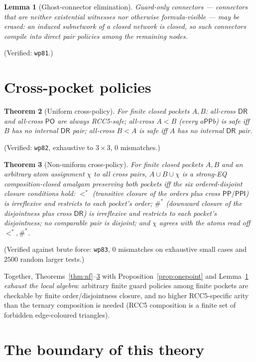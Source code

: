 \documentclass[11pt]{article}
\newcommand{\DR}{\mathsf{DR}}
\newcommand{\PO}{\mathsf{PO}}
\newcommand{\PP}{\mathsf{PP}}
\newcommand{\PPI}{\mathsf{PPI}}
\newcommand{\code}[1]{\texttt{#1}}
\theoremstyle{plain}
\newtheorem{theorem}{Theorem}
\newtheorem{lemma}[theorem]{Lemma}
\theoremstyle{definition}
\begin{document}
\begin{lemma}[Ghost-connector elimination]\label{lem:ghost}
Guard-only connectors --- connectors that are neither existential
witnesses nor otherwise formula-visible --- may be erased: an induced
subnetwork of a closed network is closed, so such connectors compile
into direct pair policies among the remaining nodes.
\end{lemma}
(Verified: \code{wp81}.)

\section{Cross-pocket policies}

\begin{theorem}[Uniform cross-policy]\label{thm:uniform}
For finite closed pockets $A,B$: all-cross $\DR$ and all-cross $\PO$ are
always RCC5-safe; all-cross $A<B$ (every $a\mathbin{\PP}b$) is safe iff
$B$ has no internal $\DR$ pair; all-cross $B<A$ is safe iff $A$ has no
internal $\DR$ pair.
\end{theorem}
(Verified: \code{wp82}, exhaustive to $3{\times}3$, $0$ mismatches.)

\begin{theorem}[Non-uniform cross-policy]\label{thm:nonuniform}
For finite closed pockets $A,B$ and an arbitrary atom assignment $\chi$
to all cross pairs, $A\cup B\cup\chi$ is a strong-EQ composition-closed
amalgam preserving both pockets iff the six ordered-disjoint closure
conditions hold: $<^{*}$ (transitive closure of the orders plus cross
$\PP/\PPI$) is irreflexive and restricts to each pocket's order; $\#^{*}$
(downward closure of the disjointness plus cross $\DR$) is irreflexive
and restricts to each pocket's disjointness; no comparable pair is
disjoint; and $\chi$ agrees with the atoms read off $<^{*},\#^{*}$.
\end{theorem}
(Verified against brute force: \code{wp83}, $0$ mismatches on exhaustive
small cases and $2500$ random larger tests.)

Together, Theorems~\ref{thm:nf}--\ref{thm:nonuniform} with
Proposition~\ref{prop:onepoint} and Lemma~\ref{lem:ghost} \emph{exhaust
the local algebra}: arbitrary finite guard policies among finite pockets
are checkable by finite order/disjointness closure, and no higher
RCC5-specific arity than the ternary composition is needed (RCC5
composition is a finite set of forbidden edge-coloured triangles).

\section{The boundary of this theory}
\end{document}
